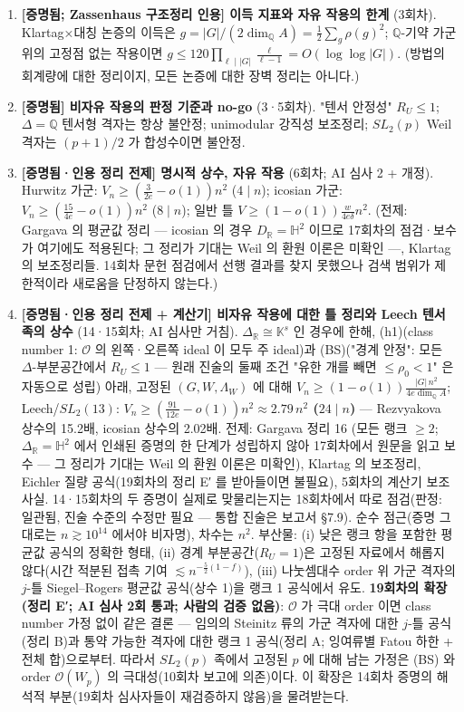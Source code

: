 \begin{enumerate}
\def\labelenumi{\arabic{enumi}.}
\item
  \textbf{{[}증명됨; Zassenhaus 구조정리 인용{]} 이득 지표와 자유 작용의 한계} (3회차). Klartag×대칭 논증의 이득은 \(g=|G|/(2\dim_\mathbb QA)=\tfrac12\sum_g\rho(g)^2\); \(\mathbb Q\)-기약 가군 위의 고정점 없는 작용이면 \(g\le120\prod_{\ell\mid|G|}\frac{\ell}{\ell-1}=O(\log\log|G|)\). (방법의 회계량에 대한 정리이지, 모든 논증에 대한 장벽 정리는 아니다.)
\item
  \textbf{{[}증명됨{]} 비자유 작용의 판정 기준과 no-go} (3·5회차). "텐서 안정성" \(R_U\le1\); \(\Delta=\mathbb Q\) 텐서형 격자는 항상 불안정; unimodular 강직성 보조정리; \(SL_2(p)\) Weil 격자는 \((p+1)/2\) 가 합성수이면 불안정.
\item
  \textbf{{[}증명됨·인용 정리 전제{]} 명시적 상수, 자유 작용} (6회차; AI 심사 2 + 개정). Hurwitz 가군: \(V_n\ge(\tfrac3{2e}-o(1))n^2\) (\(4\mid n\)); icosian 가군: \(V_n\ge(\tfrac{15}{4e}-o(1))n^2\) (\(8\mid n\)); 일반 틀 \(V\ge(1-o(1))\tfrac{w}{4e\delta}n^2\). (전제: Gargava 의 평균값 정리 --- icosian 의 경우 \(D_\mathbb R=\mathbb H^2\) 이므로 17회차의 점검·보수가 여기에도 적용된다; 그 정리가 기대는 Weil 의 환원 이론은 미확인 ---, Klartag 의 보조정리들. 14회차 문헌 점검에서 선행 결과를 찾지 못했으나 검색 범위가 제한적이라 새로움을 단정하지 않는다.)
\item
  \textbf{{[}증명됨·인용 정리 전제 + 계산기{]} 비자유 작용에 대한 틀 정리와 Leech 텐서족의 상수} (14·15회차; AI 심사만 거침). \(\Delta_\mathbb R\cong\mathbb K^s\) 인 경우에 한해, (h1)(class number 1: \(\mathcal O\) 의 왼쪽·오른쪽 ideal 이 모두 주 ideal)과 (BS)("경계 안정": 모든 \(\Delta\)-부분공간에서 \(R_U\le1\) --- 원래 진술의 둘째 조건 "유한 개를 빼면 \(\le\rho_0<1\)" 은 자동으로 성립) 아래, 고정된 \((G,W,\Lambda_W)\) 에 대해 \(V_n\ge(1-o(1))\frac{|G|\,n^2}{4e\dim_\mathbb QA}\); Leech/\(SL_2(13)\): \textbf{\(V_n\ge(\frac{91}{12e}-o(1))n^2\approx2.79\,n^2\) (\(24\mid n\))} --- Rezvyakova 상수의 15.2배, icosian 상수의 2.02배. 전제: Gargava 정리 16 (모든 랭크 \(\ge2\); \(\Delta_\mathbb R=\mathbb H^2\) 에서 인쇄된 증명의 한 단계가 성립하지 않아 17회차에서 원문을 읽고 보수 --- 그 정리가 기대는 Weil 의 환원 이론은 미확인), Klartag 의 보조정리, Eichler 질량 공식(19회차의 정리 E′ 를 받아들이면 불필요), 5회차의 계산기 보조 사실. 14·15회차의 두 증명이 실제로 맞물리는지는 18회차에서 따로 점검(판정: 일관됨, 진술 수준의 수정만 필요 --- 통합 진술은 보고서 §7.9). 순수 점근(증명 그대로는 \(n\gtrsim10^{14}\) 에서야 비자명), 차수는 \(n^2\). 부산물: (i) 낮은 랭크 항을 포함한 평균값 공식의 정확한 형태, (ii) 경계 부분공간(\(R_U=1\))은 고정된 자료에서 해롭지 않다(시간 적분된 접촉 기여 \(\lesssim n^{-\frac52(1-f)}\)), (iii) 나눗셈대수 order 위 가군 격자의 \(j\)-틀 Siegel--Rogers 평균값 공식(상수 1)을 랭크 1 공식에서 유도. \textbf{19회차의 확장(정리 E′; AI 심사 2회 통과; 사람의 검증 없음)}: \(\mathcal O\) 가 극대 order 이면 class number 가정 없이 같은 결론 --- 임의의 Steinitz 류의 가군 격자에 대한 \(j\)-틀 공식(정리 B)과 통약 가능한 격자에 대한 랭크 1 공식(정리 A; 잉여류별 Fatou 하한 + 전체 합)으로부터. 따라서 \(SL_2(p)\) 족에서 고정된 \(p\) 에 대해 남는 가정은 (BS) 와 order \(\mathcal O(W_p)\) 의 극대성(10회차 보고에 의존)이다. 이 확장은 14회차 증명의 해석적 부분(19회차 심사자들이 재검증하지 않음)을 물려받는다.

\end{enumerate}
